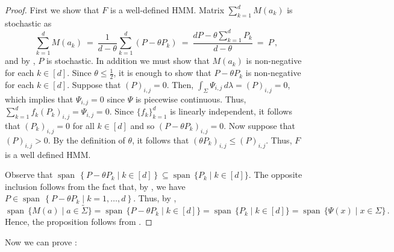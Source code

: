 \documentclass[a4paper,UKenglish,cleveref, autoref,mathscr]{lipics-v2019}
\newcommand{\1}{\mathbbm{1}}
\DeclareMathOperator{\Span}{span\,}
\begin{document}
\begin{proof}
First we show that $F$ is a well-defined HMM. Matrix $\sum_{k=1}^d M(a_k)$ is stochastic as
\begin{equation}\label{sumofps}
\sum_{k=1}^d M(a_k) \ = \ \frac{1}{d - \theta}\sum_{k = 1}^d (P - \theta P_k) \ = \ \frac{dP - \theta \sum_{k=1}^d P_k}{d - \theta} \ = \ P\,,
\end{equation}
and by , $P$ is stochastic. In addition we must show that $M(a_k)$ is non-negative for each $k \in [d]$.
Since $\theta \le \frac12$, it is enough to show that $P - \theta P_k$ is non-negative for each $k \in [d]$. Suppose that $(P)_{i,j} = 0$.
Then, $\int_\Sigma \Psi_{i,j}\, d\lambda = (P)_{i,j} = 0$, which implies that $\Psi_{i,j} = 0$ since $\Psi$ is piecewise continuous.
Thus, $\sum_{k = 1}^d f_k (P_k)_{i,j} = \Psi_{i,j} = 0$.
Since $\{f_k\}_{k=1}^d$ is linearly independent, it follows that $(P_k)_{i,j} = 0$ for all $k \in [d]$ and so $(P - \theta P_k)_{i,j} = 0$.
Now suppose that $(P)_{i,j} > 0$. By the definition of $\theta$, it follows that $(\theta P_k)_{i,j} \leq (P)_{i,j}$. %
Thus, $F$ is a well defined HMM.

Observe that $\Span \left\{ P - \theta P_k \mid k \in [d] \right\} \subseteq \Span \{P_k \mid k \in [d]\}$.
The opposite inclusion follows from the fact that, by , we have $P \in \Span \left\{ P - \theta P_k \mid k = 1, \dots, d \right\}$.
Thus, by ,
\[\Span\{M(a) \mid a \in \tilde{\Sigma}\} = \Span\{P - \theta P_k \mid k \in [d]\} = \Span\{P_k  \mid k \in [d]\} = \Span\{\Psi(x) \mid x \in \Sigma\}\,.\]
Hence, the proposition follows from .
\end{proof}

Now we can prove :
\end{document}
